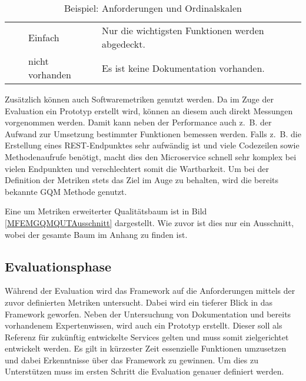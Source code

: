 \begin{table}[!htb]
{\begin{tabular}{p{3cm}|p{3cm}|p{2cm}|p{8cm}}
		\\ \cline{3-4} &                                                                                       
		& Einfach & Nur die wichtigsten Funktionen werden abgedeckt.                                                                     
		\\ \cline{3-4} &                                                                                       
		& nicht vorhanden & Es ist keine Dokumentation vorhanden.                                                                                
		\\ \hline
	\end{tabular}
	}
	\caption[Beispiele für Ordinalskalen]{Beispiel: Anforderungen und Ordinalskalen}
	\label{OrdinalskalaBeispiele}
\end{table}
\FloatBarrier

Zusätzlich können auch Softwaremetriken genutzt werden. Da im Zuge der Evaluation ein Prototyp erstellt wird, können an diesem auch direkt Messungen vorgenommen werden. Damit kann neben der Performance auch z.~B. der Aufwand zur Umsetzung bestimmter Funktionen bemessen werden. Falls z.~B. die Erstellung eines \ac{REST}-Endpunktes sehr aufwändig ist und viele Codezeilen sowie Methodenaufrufe benötigt, macht dies den Microservice schnell sehr komplex bei vielen Endpunkten und verschlechtert somit die Wartbarkeit.
Um bei der Definition der Metriken stets das Ziel im Auge zu behalten, wird die bereits bekannte \ac{GQM} Methode genutzt. 

Eine um Metriken erweiterter Qualitätsbaum ist in Bild \ref{MFEMGQMQUTAusschnitt} dargestellt. Wie zuvor ist dies nur ein Ausschnitt, wobei der gesamte Baum im Anhang zu finden ist.


\subsection{Evaluationsphase}


Während der Evaluation wird das Framework auf die Anforderungen mittels der zuvor definierten Metriken untersucht. Dabei wird ein tieferer Blick in das Framework geworfen. Neben der Untersuchung von Dokumentation und bereits vorhandenem Expertenwissen, wird auch ein Prototyp erstellt. Dieser soll als Referenz für zukünftig entwickelte Services gelten und muss somit zielgerichtet entwickelt werden. Es gilt in kürzester Zeit essenzielle Funktionen umzusetzen und dabei Erkenntnisse über das Framework zu gewinnen. Um dies zu Unterstützen muss im ersten Schritt die Evaluation genauer definiert werden.

